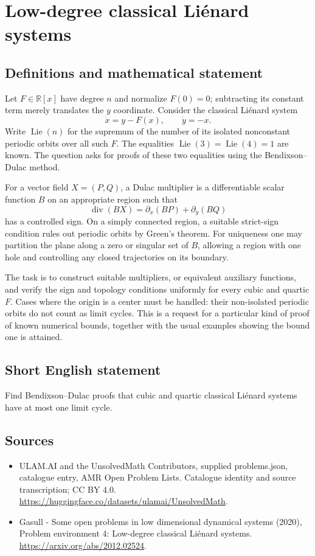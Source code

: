 \documentclass[11pt,a4paper]{article}
\begin{document}
\section*{Low-degree classical Liénard systems}\label{statement}

\subsection{Definitions and mathematical statement}
Let $F\in\mathbb R[x]$ have degree $n$ and normalize $F(0)=0$; subtracting its
constant term merely translates the $y$ coordinate. Consider the classical
Liénard system
\[
 \dot x=y-F(x),\qquad \dot y=-x.
\]
Write $\operatorname{Lie}(n)$ for the supremum of the number of its isolated
nonconstant periodic orbits over all such $F$. The equalities
$\operatorname{Lie}(3)=\operatorname{Lie}(4)=1$ are known. The question asks
for proofs of these two equalities using the Bendixson–Dulac method.

For a vector field $X=(P,Q)$, a Dulac multiplier is a differentiable scalar
function $B$ on an appropriate region such that
\[
 \operatorname{div}(BX)=\partial_x(BP)+\partial_y(BQ)
\]
has a controlled sign. On a simply connected region, a suitable strict-sign
condition rules out periodic orbits by Green's theorem. For uniqueness one
may partition the plane along a zero or singular set of $B$, allowing a
region with one hole and controlling any closed trajectories on its boundary.

The task is to construct suitable multipliers, or equivalent auxiliary
functions, and verify the sign and topology conditions uniformly for every
cubic and quartic $F$. Cases where the origin is a center must be handled:
their non-isolated periodic orbits do not count as limit cycles. This is a
request for a particular kind of proof of known numerical bounds, together
with the usual examples showing the bound one is attained.
\subsection{Short English statement}
Find Bendixson–Dulac proofs that cubic and quartic classical Liénard systems have at most one limit cycle.
\subsection{Sources}
\begin{itemize}
\item[S1] ULAM.AI and the UnsolvedMath Contributors, supplied problems.json, catalogue entry, AMR Open Problem Lists. Catalogue identity and source transcription; CC BY 4.0.
\url{https://huggingface.co/datasets/ulamai/UnsolvedMath}.
\item[S2] Gasull - Some open problems in low dimensional dynamical systems (2020), Problem environment 4: Low-degree classical Liénard systems. 
\url{https://arxiv.org/abs/2012.02524}.
\end{itemize}
\end{document}
